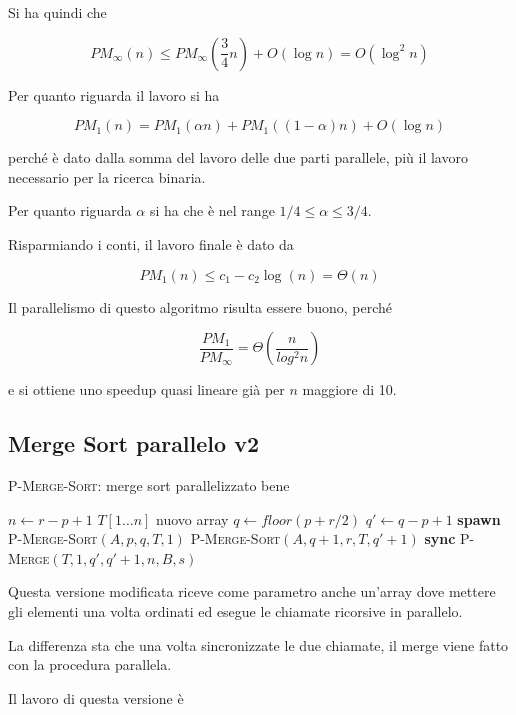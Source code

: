 Si ha quindi che

$$
PM_\infty(n) \leq PM_\infty(\frac{3}{4}n) + O(\log n) = O(\log^2 n)
$$

Per quanto riguarda il lavoro si ha

$$
PM_1(n) = PM_1(\alpha n) + PM_1( (1-\alpha) n) + O(\log n)
$$

perché è dato dalla somma del lavoro delle due parti parallele, più il lavoro necessario per la ricerca binaria.

Per quanto riguarda $\alpha$ si ha che è nel range $1/4 \leq \alpha \leq 3/4$.

Risparmiando i conti, il lavoro finale è dato da

$$
PM_1(n) \leq c_1 - c_2 \log (n) = \Theta (n)
$$

Il parallelismo di questo algoritmo risulta essere buono, perché

$$
\frac{PM_1}{PM_\infty} = \Theta (\frac{n}{log^2 n})
$$

e si ottiene uno speedup quasi lineare già per $n$ maggiore di 10.

\subsection{Merge Sort parallelo v2}\label{merge-sort-parallelo-v2}

\begin{breakablealgorithm}
	\caption{\textsc{P-Merge-Sort}: merge sort parallelizzato bene}
	\begin{algorithmic}[1]
\State $n \gets r - p +1$
    \State \Return
\EndIf 
{}
    \State $T[1 \ldots n] $ nuovo array
    \State $q \gets floor(p+r/2)$
    \State $q' \gets q - p +1$
    \State \textbf{spawn } \textsc{P-Merge-Sort}$(A,p,q, T, 1)$
    \State \textsc{P-Merge-Sort}$(A,q+1,r, T, q'+1)$
    \State \textbf{sync}
    \State \textsc{P-Merge}$(T, 1, q', q'+1, n, B, s)$
\EndIf
\EndFunction
\end{algorithmic}
\end{breakablealgorithm}

Questa versione modificata riceve come parametro anche un'array dove mettere gli elementi una volta ordinati ed esegue le chiamate ricorsive in parallelo.

La differenza sta che una volta sincronizzate le due chiamate, il merge viene fatto con la procedura parallela.

Il lavoro di questa versione è

